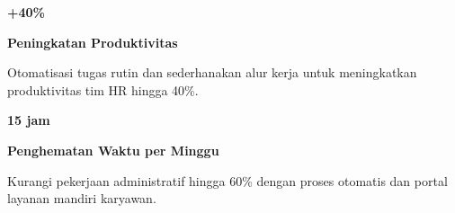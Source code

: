 \documentclass[a4paper]{article}
\begin{document}
\noindent
\begin{minipage}[t]{0.485\textwidth}
    \noindent\colorbox{BlueBg}{%
        \begin{minipage}[t]{\dimexpr\linewidth-2\fboxsep}
            \vspace{6pt}
            {\fontsize{20}{24}\selectfont\bfseries\color{BluePrimary} +40\%}\par\vspace{2pt}
            {\fontsize{9.5}{12}\selectfont\bfseries\color{BlueDark} Peningkatan Produktivitas}\par\vspace{2pt}
            {\fontsize{8.5}{11}\selectfont\color{TextDark}Otomatisasi tugas rutin dan sederhanakan alur kerja untuk meningkatkan produktivitas tim HR hingga 40\%.}%
            \vspace{6pt}
        \end{minipage}}%
    \vspace{6pt}
    \noindent\colorbox{BlueBg}{%
        \begin{minipage}[t]{\dimexpr\linewidth-2\fboxsep}
            \vspace{6pt}
            {\fontsize{20}{24}\selectfont\bfseries\color{BluePrimary} 15 jam}\par\vspace{2pt}
            {\fontsize{9.5}{12}\selectfont\bfseries\color{BlueDark} Penghematan Waktu per Minggu}\par\vspace{2pt}
            {\fontsize{8.5}{11}\selectfont\color{TextDark}Kurangi pekerjaan administratif hingga 60\% dengan proses otomatis dan portal layanan mandiri karyawan.}%
            \vspace{6pt}
        \end{minipage}}%
\end{minipage}%
\hfill
\end{document}

